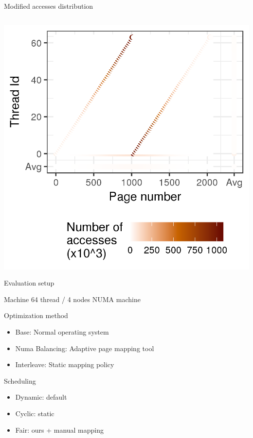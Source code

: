 \documentclass[xcolor={usenames,dvipsnames},hyperref={pdfusetitle}]{beamer}
\begin{document}
\begin{frame}{Modified accesses distribution}
{\begin{columns}
\begin{column}{.45\linewidth}
            \end{column}
        \end{columns}
    }{
        \centering
        \includegraphics[width=.65\linewidth]{tabarnac/is_b_kb1_dist_m.png}
    }
    \pause
\end{frame}

\begin{frame}{Evaluation setup}
    \begin{block}{Machine}
        64 thread / 4 nodes NUMA machine
    \end{block}
    \pause
    \begin{block}{Optimization method}
        \begin{itemize}
            \item Base: Normal operating system
            \item Numa Balancing: Adaptive page mapping tool
            \item Interleave: Static mapping policy
        \end{itemize}
    \end{block}
    \pause
    \begin{alertblock}{Scheduling}
        \begin{itemize}
            \item Dynamic: default
            \item Cyclic: static
            \item Fair: ours + manual mapping
        \end{itemize}
    \end{alertblock}
\end{frame}
\end{document}
